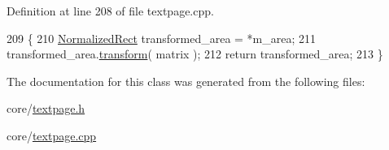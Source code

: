 Definition at line 208 of file textpage.\+cpp.


\begin{DoxyCode}
209 \{
210     \hyperlink{classOkular_1_1NormalizedRect}{NormalizedRect} transformed\_area = *m\_area;
211     transformed\_area.\hyperlink{classOkular_1_1NormalizedRect_ae3bd6448865cb5b1f2b0fb8327d47e9b}{transform}( matrix );
212     \textcolor{keywordflow}{return} transformed\_area;
213 \}
\end{DoxyCode}


The documentation for this class was generated from the following files\+:\begin{DoxyCompactItemize}
\item 
core/\hyperlink{textpage_8h}{textpage.\+h}\item 
core/\hyperlink{textpage_8cpp}{textpage.\+cpp}\end{DoxyCompactItemize}
